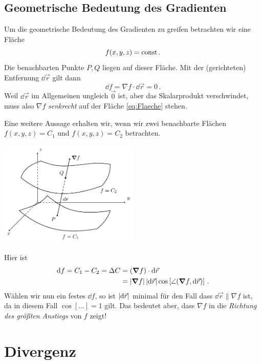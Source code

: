 \documentclass[paper=a4, fontsize=11.0pt, abstractoff, DIV12]{scrartcl}
\begin{document}
\subsection{Geometrische Bedeutung des Gradienten}

Um die geometrische Bedeutung des Gradienten zu greifen betrachten wir eine
Fläche
\begin{equation}
f(x,y,z) = \mathrm{const}\, .
\label{eq:Flaeche}
\end{equation}
Die benachbarten Punkte $P, Q$ liegen auf dieser Fläche. Mit der (gerichteten) Entfernung $\dd \vec r$ gilt dann
\begin{equation}
\dd f = \nabla f \cdot \dd \vec r = 0\,.
\end{equation}
Weil $\dd \vec r$ im Allgemeinen ungleich $\vec 0$ ist, aber das Skalarprodukt
verschwindet, muss also $\nabla f$ \emph{senkrecht} auf der Fläche
\eqref{eq:Flaeche} stehen.

Eine weitere Aussage erhalten wir, wenn wir zwei benachbarte Flächen
$f(x,y,z) = C_1$ und $f(x,y,z) = C_2$ betrachten.

\begin{center}
    \includegraphics[width=0.5\textwidth]{Figures/Grad}
\end{center}
Hier ist
\begin{align}
\dd f = C_1 - C_2 = \Delta C &= (\nabla f)\cdot \dd \vec r\nonumber\\
&=\abs{\nabla f} \abs{\dd \vec r}\cos\left[\angle(\nabla f, \dd \vec r) \right]\,.
\end{align}
Wählen wir nun ein festes $\dd f$, so ist $\abs{\dd \vec r}$ minimal für den
Fall dass $\dd \vec r \parallel \nabla f$ ist, da in diesem Fall $\cos[\dots]=1$ gilt. Das bedeutet aber, dass $\nabla f$ in die \emph{Richtung des größten Anstiegs} von $f$ zeigt!

\section{Divergenz}
\end{document}
